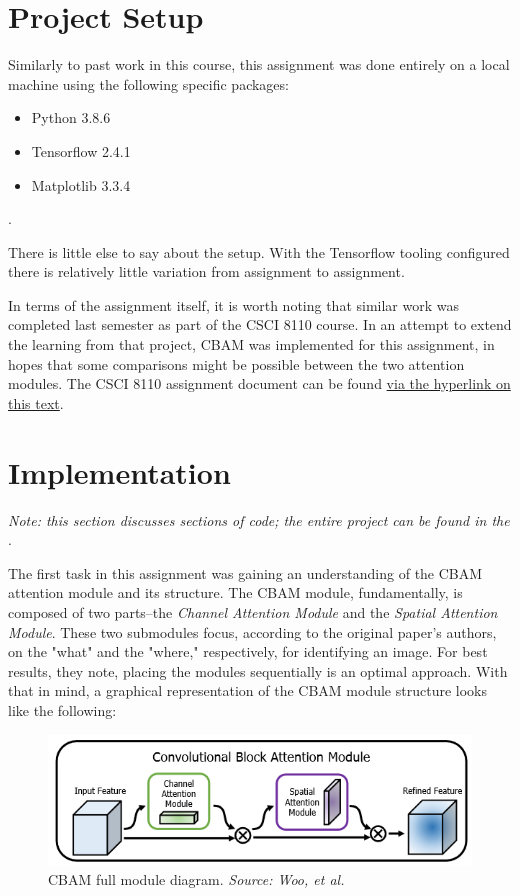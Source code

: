 \documentclass{article}
\begin{document}
  
  \graphicspath{{./images/}}

\section{Project Setup} \label{setup}
Similarly to past work in this course, this assignment was done entirely on a local machine using the following specific packages:
\begin{itemize}
    \item Python 3.8.6 
    \item Tensorflow 2.4.1
    \item Matplotlib 3.3.4
\end{itemize}.

There is little else to say about the setup. With the Tensorflow tooling configured there is relatively little variation from assignment to assignment. 

In terms of the assignment itself, it is worth noting that similar work was completed last semester as part of the CSCI 8110 course.
In an attempt to extend the learning from that project, CBAM was implemented for this assignment, in hopes that some comparisons might be possible between the two attention modules.
The CSCI 8110 assignment document can be found \href{https://keybase.pub/pdav/academics/8110\%20Reports/Davlin_HW3_V2.pdf}{via the hyperlink on this text}.

\section{Implementation} \label{impl}
\textit{Note: this section discusses sections of code; the entire project can be found in the }.

The first task in this assignment was gaining an understanding of the CBAM attention module and its structure.
The CBAM module, fundamentally, is composed of two parts--the \textit{Channel Attention Module} and the \textit{Spatial Attention Module}.
These two submodules focus, according to the original paper's authors, on the "what" and the "where," respectively, for identifying an image.
For best results, they note, placing the modules sequentially is an optimal approach.
With that in mind, a graphical representation of the CBAM module structure looks like the following: 

\begin{figure}[H]
    \centering
    \includegraphics[width=5in]{csci-8920/hw-4/images/cbam-full-diagram.png}
    \caption{CBAM full module diagram. \textit{Source: Woo, et al.} \cite{Woo2018CBAM:Module}}
    \label{fig:cbam_full_diag}
\end{figure}
\end{document}
